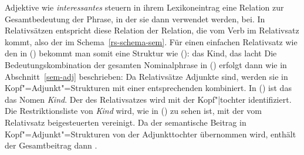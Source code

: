 Adjektive wie \emph{interessantes} steuern in ihrem Lexikoneintrag eine Relation zur Gesamtbedeutung der Phrase,
in der sie dann verwendet werden, bei. In Relativsätzen entspricht diese Relation der Relation, die
vom Verb im Relativsatz kommt, also der  im Schema~\ref{rs-schema-sem}.
Für einen einfachen Relativsatz wie den in () bekommt man somit eine Struktur wie ():
\ea
das Kind, das lacht
\z
\ea
{}
\z
Die Bedeutungskombination der gesamten Nominalphrase in () erfolgt dann wie in
Abschnitt~\ref{sem-adj} beschrieben: Da Relativsätze Adjunkte sind, werden sie in Kopf"=Adjunkt"=Strukturen
mit einer entsprechenden \nbar kombiniert. In () ist das das Nomen \emph{Kind}. Der \modw des Relativsatzes
wird mit der Kopf"|tochter identifiziert. Die Restriktionsliste von
\emph{Kind}  wird, wie in () zu sehen ist, mit der vom Relativsatz beigesteuerten vereinigt.
Da der semantische Beitrag in Kopf"=Adjunkt"=Strukturen von der Adjunkttochter übernommen wird,
enthält der Gesamtbeitrag dann .

